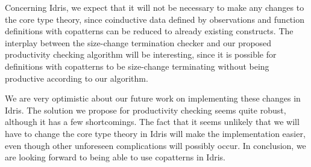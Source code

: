 Concerning Idris, we expect that it will not be necessary to make any changes to the core type theory, since coinductive data defined by observations and function definitions with copatterns can be reduced to already existing constructs. The interplay between the size-change termination checker and our proposed productivity checking algorithm will be interesting, since it is possible for definitions with copatterns to be size-change terminating without being productive according to our algorithm.

We are very optimistic about our future work on implementing these changes in Idris. The solution we propose for productivity checking seems quite robust, although it has a few shortcomings. The fact that it seems unlikely that we will have to change the core type theory in Idris will make the implementation easier, even though other unforeseen complications will possibly occur. In conclusion, we are looking forward to being able to use copatterns in Idris.
